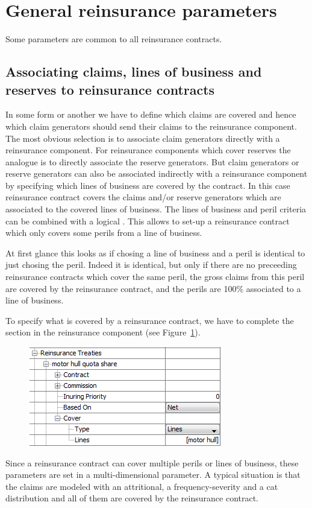 \section{General reinsurance parameters}
\label{sec:generalReParams}


Some parameters are common to all reinsurance contracts. 

\subsection{Associating claims, lines of business and reserves to reinsurance contracts}

In some form or another we have to define which claims are covered
and hence which claim generators should send their claims to the reinsurance component. The most obvious selection is to associate claim generators directly with a reinsurance component. For reinsurance components which cover reserves the analogue is to directly associate the reserve generators. But claim generators or reserve generators can also be associated indirectly with a reinsurance component by specifying which lines of business are covered by the contract. In this case reinsurance contract covers the claims and/or reserve generators which are associated to the covered lines of business. The lines of business and peril criteria can be combined with a logical . This allows to set-up a reinsurance contract which only covers some perils from a line of business. 

At first glance this looks as if chosing a line of business and a peril is identical to just chosing the peril. Indeed it is identical, but only if there are no preceeding reinsurance contracts which cover the same peril, \ie the gross claims from this peril are covered by the reinsurance contract, and the perils are 100\% associated to a line of business. 

To specify what is covered by a reinsurance contract, we have to complete the section   in the reinsurance component (see Figure~\ref{fig:reinsCover}).
\begin{figure}
		\centering
		\includegraphics{images/reinsCover.png}
	\caption{}
	\label{fig:reinsCover}
\end{figure}
Since a  reinsurance contract can cover multiple perils or lines of business, these parameters are set in a multi-dimensional parameter. A typical situation is that the claims are modeled with an attritional, a frequency-severity and a cat distribution and all of them are covered by the reinsurance contract. 

